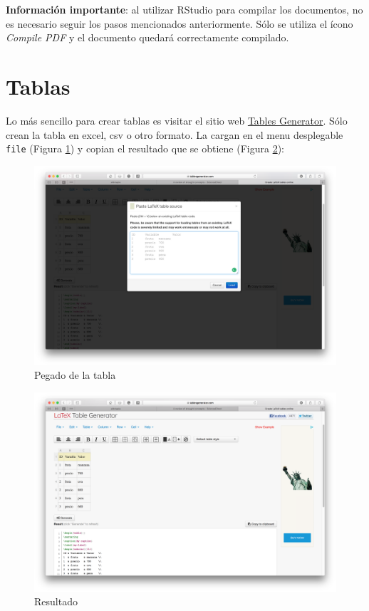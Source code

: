 \documentclass[11pt,]{article}
\begin{document}
\textbf{Información importante}: al utilizar RStudio para compilar los documentos, no es necesario seguir los pasos mencionados anteriormente. Sólo se utiliza el ícono \textit{Compile PDF} y el documento quedará correctamente compilado.

\section{Tablas\\}

Lo más sencillo para crear tablas es visitar el sitio web \href{https://www.tablesgenerator.com/latex_tables}{Tables Generator}. Sólo crean la tabla en excel, csv o otro formato. La cargan en el menu desplegable \verb!file! (Figura \ref{tabla1}) y copian el resultado que se obtiene (Figura \ref{tabla2}):

\begin{figure}[!h]
\begin{center}
\includegraphics[width=\textwidth]{Figuras/tabla1.png}
\caption{Pegado de la tabla}
\label{tabla1}
\end{center}
\end{figure}

\begin{figure}[!h]
\begin{center}
\includegraphics[width=\textwidth]{Figuras/tabla2.png}
\caption{Resultado}
\label{tabla2}
\end{center}
\end{figure}
\end{document}
